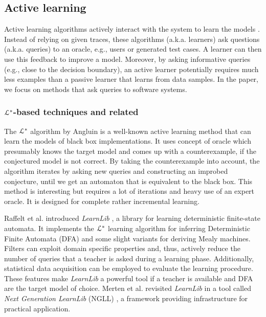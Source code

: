 
\subsection{Active learning}
\label{sec:related:modelinf:active}

Active learning algorithms actively interact with the system to
learn the models \cite{settles.tr09}. Instead of relying on given
traces, these algorithms (a.k.a. learners) ask questions (a.k.a.
queries) to an oracle, e.g., users or generated test cases. A
learner can then use this feedback to improve a model. Moreover,
by asking informative queries (e.g., close to the decision
boundary), an active learner potentially requires much less
examples than a passive learner that learns from data samples. In
the paper, we focus on methods that ask queries to software
systems.

\subsubsection{$\EuScript{L}^*$-based techniques and related}
\label{sec:related:modelinf:active-letoile}

The $\EuScript{L}^*$ algorithm by Angluin \cite{Angluin198787} is
a well-known active learning method that can learn the models of
black box implementations. It uses concept of oracle which
presumably knows the target model and comes up with a
counterexample, if the conjectured model is not correct. By
taking the counterexample into account, the algorithm iterates by
asking new queries and constructing an improbed conjecture, until
we get an automaton that is equivalent to the black box. This
method is interesting but requires a lot of iterations and heavy
use of an expert oracle. It is designed for complete rather
incremental learning.

Raffelt et al. introduced \textit{LearnLib}
\cite{Raffelt:2005:LLA:1081180.1081189}, a library for learning
deterministic finite-state automata. It implements the
$\EuScript{L}^*$ \cite{Angluin198787} learning algorithm for
inferring Deterministic Finite Automata (DFA) and some slight
variants for deriving Mealy machines. Filters can exploit domain
specific properties and, thus, actively reduce the number of
queries that a teacher is asked during a learning phase.
Additionally, statistical data acquisition can be employed to
evaluate the learning procedure. These features make
\textit{LearnLib} a powerful tool if a teacher is available and
DFA are the target model of choice.
Merten et al. revisited \textit{LearnLib} in a tool called
\textit{Next Generation LearnLib} (NGLL) \cite{ngll11}, a
framework providing infrastructure for practical application.

